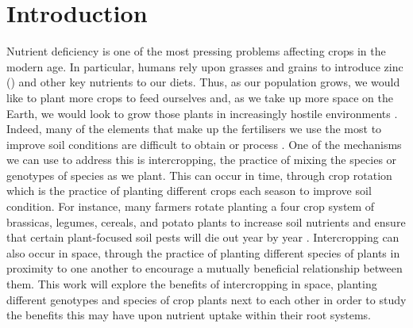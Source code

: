 \documentclass[11pt]{article}
\numberwithin{equation}{section}
\begin{document}
\newpage
\doublespacing
\tableofcontents

\singlespacing
\newpage
{}
\setcounter{page}{1}




\section{Introduction}

Nutrient deficiency is one of the most pressing problems affecting crops in the modern age. In particular, humans rely upon grasses and grains to introduce zinc () and other key nutrients to our diets. Thus, as our population grows, we would like to plant more crops to feed ourselves and, as we take up more space on the Earth, we would look to grow those plants in increasingly hostile environments \cite{calicioglu_2019}. Indeed,  many of the elements that make up the fertilisers we use the most to improve soil conditions are difficult to obtain or process \cite{fact.mr_2021}. One of the mechanisms we can use to address this is intercropping, the practice of mixing the species or genotypes of species as we plant. This can occur in time, through crop rotation which is the practice of planting different crops each season to improve soil condition. For instance, many farmers rotate planting a four crop system of brassicas, legumes, cereals, and potato plants to increase soil nutrients and ensure that certain plant-focused soil pests will die out year by year \cite{xuan_2011}. Intercropping can also occur in space, through the practice of planting different species of plants in proximity to one another to encourage a mutually beneficial relationship between them. This work will explore the benefits of intercropping in space, planting different genotypes and species of crop plants next to each other in order to study the benefits this may have upon nutrient uptake within their root systems.
\end{document}

